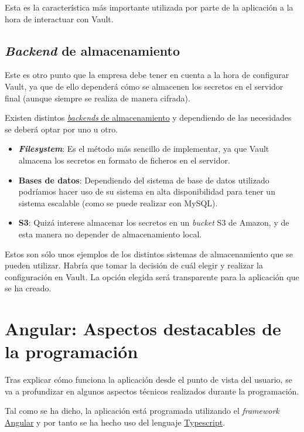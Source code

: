 \documentclass{\ClassPath/viu-tfm-template}
\begin{document}
Esta es la característica más importante utilizada por parte de la aplicación a la hora de interactuar con Vault.


\subsection{\textit{Backend} de almacenamiento}

Este es otro punto que la empresa debe tener en cuenta a la hora de configurar Vault, ya que de ello dependerá cómo se almacenen los secretos en el servidor final (aunque siempre se realiza de manera cifrada).

Existen distintos \href{https://developer.hashicorp.com/vault/docs/configuration/storage}{\textit{backends} de almacenamiento} y dependiendo de las necesidades se deberá optar por uno u otro.

\begin{itemize}
    \item \textbf{\textit{Filesystem}}: Es el método más sencillo de implementar, ya que Vault almacena los secretos en formato de ficheros en el servidor.
    \item \textbf{Bases de datos}: Dependiendo del sistema de base de datos utilizado podríamos hacer uso de su sistema en alta disponibilidad para tener un sistema escalable (como se puede realizar con MySQL).
    \item \textbf{S3}: Quizá interese almacenar los secretos en un \textit{bucket} S3 de Amazon, y de esta manera no depender de almacenamiento local.
\end{itemize}

Estos son sólo unos ejemplos de los distintos sistemas de almacenamiento que se pueden utilizar. Habría que tomar la decisión de cuál elegir y realizar la configuración en Vault. La opción elegida será transparente para la aplicación que se ha creado.


\section{Angular: Aspectos destacables de la programación}

Tras explicar cómo funciona la aplicación desde el punto de vista del usuario, se va a profundizar en algunos aspectos técnicos realizados durante la programación.

Tal como se ha dicho, la aplicación está programada utilizando el \textit{framework} \href{https://angular.io/}{Angular} y por tanto se ha hecho uso del lenguaje \href{https://www.typescriptlang.org/}{Typescript}.
\end{document}

